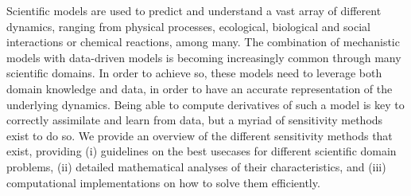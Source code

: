 Scientific models are used to predict and understand a vast array of different dynamics, ranging from physical processes, ecological, biological and social interactions or chemical reactions, among many. 
The combination of mechanistic models with data-driven models is becoming increasingly common through many scientific domains. 
In order to achieve so, these models need to leverage both domain knowledge and data, in order to have an accurate representation of the underlying dynamics. 
Being able to compute derivatives of such a model is key to correctly assimilate and learn from data, but a myriad of sensitivity methods exist to do so. 
We provide an overview of the different sensitivity methods that exist, providing (i) guidelines on the best usecases for different scientific domain problems, (ii) detailed mathematical analyses of their characteristics, and (iii) computational implementations on how to solve them efficiently. 
